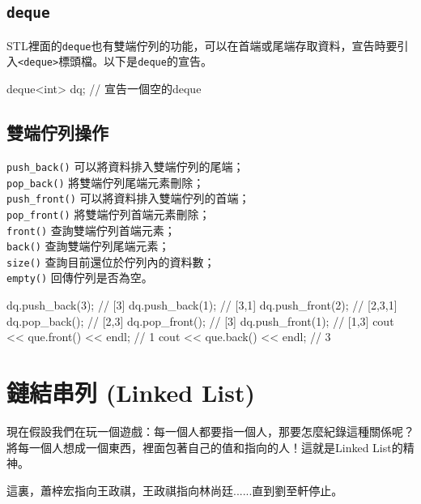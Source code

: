 \documentclass[main.tex]{subfiles}
\begin{document}
\subsection{\texttt{deque}}
STL裡面的\texttt{deque}也有雙端佇列的功能，可以在首端或尾端存取資料，宣告時要引入\texttt{<deque>}標頭檔。以下是\texttt{deque}的宣告。
\begin{C++}
deque<int> dq; // 宣告一個空的deque
\end{C++}
\subsection{雙端佇列操作}
\texttt{push\_back()} 可以將資料排入雙端佇列的尾端；\\
\indent\texttt{pop\_back()} 將雙端佇列尾端元素刪除；\\
\indent\texttt{push\_front()} 可以將資料排入雙端佇列的首端；\\
\indent\texttt{pop\_front()} 將雙端佇列首端元素刪除；\\
\indent\texttt{front()} 查詢雙端佇列首端元素；\\
\indent\texttt{back()} 查詢雙端佇列尾端元素；\\
\indent\texttt{size()} 查詢目前還位於佇列內的資料數；\\
\indent\texttt{empty()} 回傳佇列是否為空。
\begin{C++}
dq.push_back(3); // [3]
dq.push_back(1); // [3,1]
dq.push_front(2); // [2,3,1]
dq.pop_back(); // [2,3]
dq.pop_front(); // [3]
dq.push_front(1); // [1,3]
cout << que.front() << endl; // 1
cout << que.back() << endl; // 3
\end{C++}

			
\section{鏈結串列 (Linked List)}
現在假設我們在玩一個遊戲：每一個人都要指一個人，那要怎麼紀錄這種關係呢？將每一個人想成一個東西，裡面包著自己的值和指向的人！這就是Linked List的精神。
\begin{center}
\end{center}
 這裏，蕭梓宏指向王政祺，王政祺指向林尚廷......直到劉至軒停止。
\end{document}
